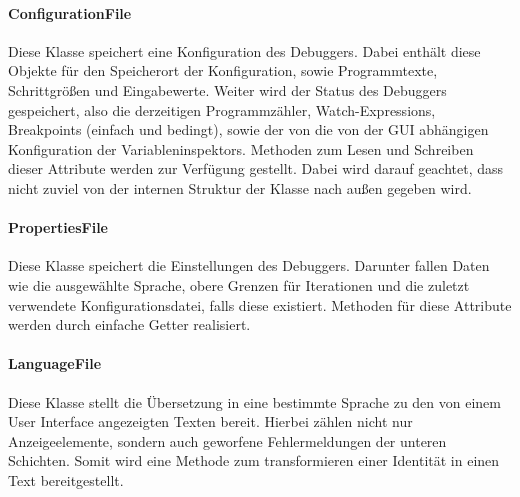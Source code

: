 \documentclass[parskip=full]{scrartcl}
\begin{document}
\paragraph{ConfigurationFile}
Diese Klasse speichert eine Konfiguration des Debuggers.
Dabei enthält diese Objekte für den Speicherort der Konfiguration, sowie Programmtexte, Schrittgrößen und Eingabewerte.
Weiter wird der Status des Debuggers gespeichert, also die derzeitigen Programmzähler, Watch-Expressions, Breakpoints (einfach und bedingt), sowie der von die von der GUI abhängigen Konfiguration der Variableninspektors.
Methoden zum Lesen und Schreiben dieser Attribute werden zur Verfügung gestellt. Dabei wird darauf geachtet, dass nicht zuviel von der internen Struktur der Klasse nach außen gegeben wird.
\paragraph{PropertiesFile}
Diese Klasse speichert die Einstellungen des Debuggers.
Darunter fallen Daten wie die ausgewählte Sprache, obere Grenzen für Iterationen und die zuletzt verwendete Konfigurationsdatei, falls diese existiert.
Methoden für diese Attribute werden durch einfache Getter realisiert.
\paragraph{LanguageFile}
Diese Klasse stellt die Übersetzung in eine bestimmte Sprache zu den von einem User Interface angezeigten Texten bereit.
Hierbei zählen nicht nur Anzeigeelemente, sondern auch geworfene Fehlermeldungen der unteren Schichten.
Somit wird eine Methode zum transformieren einer Identität in einen Text bereitgestellt.
\end{document}
